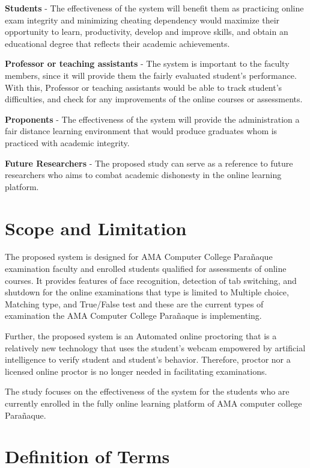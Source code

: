 \textbf{Students} - The effectiveness of the system will benefit them as practicing online exam integrity and minimizing cheating dependency would maximize their opportunity to learn, productivity, develop and improve skills, and obtain an educational degree that reflects their academic achievements.

\textbf{Professor or teaching assistants} - The system is important to the faculty members, since it will provide them the fairly evaluated student's performance.
With this, Professor or teaching assistants would be able to track student's difficulties, and check for any improvements of the online courses or assessments.

\textbf{Proponents} - The effectiveness of the system will provide the administration a fair distance learning environment that would produce graduates whom is practiced with academic integrity.

\textbf{Future Researchers} - The proposed study can serve as a reference to future researchers who aims to combat academic dishonesty in the online learning platform.

\section{Scope and Limitation}

The proposed system is designed for AMA Computer College Parañaque examination faculty and enrolled students qualified for assessments of online courses.
It provides features of face recognition, detection of tab switching, and shutdown for the online examinations that type is limited to Multiple choice, Matching type, and True/False test and these are the current types of examination the AMA Computer College Parañaque is implementing.

Further, the proposed system is an Automated online proctoring that is a relatively new technology that uses the student's webcam empowered by artificial intelligence to verify student and student's behavior.
Therefore, proctor nor a licensed online proctor is no longer needed in facilitating examinations.

The study focuses on the effectiveness of the system for the students who are currently enrolled in the fully online learning platform of AMA computer college Parañaque.

\section{Definition of Terms}

